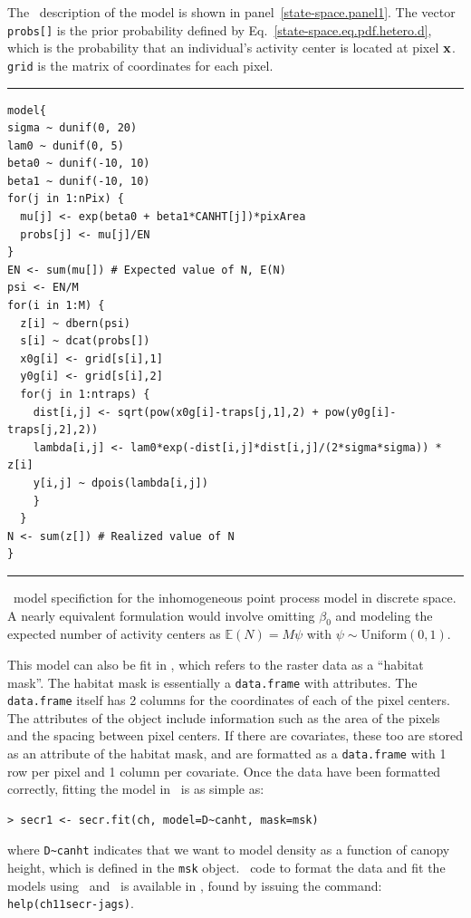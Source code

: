The \bugs~description of the model is shown in
panel~\ref{state-space.panel1}. The vector \verb+probs[]+ is the prior
probability defined by Eq.~\ref{state-space.eq.pdf.hetero.d}, which is
the probability that an individual's activity center is located at
pixel $\bf x$. \verb+grid+ is the matrix of coordinates for each pixel.

\begin{panel}%
\centering
\rule[0.05in]{\textwidth}{.03in}
\begin{small}
\begin{verbatim}
model{
sigma ~ dunif(0, 20)
lam0 ~ dunif(0, 5)
beta0 ~ dunif(-10, 10)
beta1 ~ dunif(-10, 10)
for(j in 1:nPix) {
  mu[j] <- exp(beta0 + beta1*CANHT[j])*pixArea
  probs[j] <- mu[j]/EN
}
EN <- sum(mu[]) # Expected value of N, E(N)
psi <- EN/M
for(i in 1:M) {
  z[i] ~ dbern(psi)
  s[i] ~ dcat(probs[])
  x0g[i] <- grid[s[i],1]
  y0g[i] <- grid[s[i],2]
  for(j in 1:ntraps) {
    dist[i,j] <- sqrt(pow(x0g[i]-traps[j,1],2) + pow(y0g[i]-traps[j,2],2))
    lambda[i,j] <- lam0*exp(-dist[i,j]*dist[i,j]/(2*sigma*sigma)) * z[i]
    y[i,j] ~ dpois(lambda[i,j])
    }
  }
N <- sum(z[]) # Realized value of N
}
\end{verbatim}
\end{small}
\rule[0.15in]{\textwidth}{.03in}
\caption{\bugs~model specifiction for the inhomogeneous point process model in
  discrete space. A nearly equivalent formulation would involve
  omitting $\beta_0$ and modeling the expected number of activity
  centers as $\mathbb{E}(N)=M\psi$ with $\psi \sim \text{Uniform}(0,1)$.}
\label{state-space.panel1}
\end{panel}

This model can also be fit in \secr, which refers
to the raster data as a ``habitat mask''. The habitat mask is
essentially a \verb+data.frame+ with attributes. The \verb+data.frame+
itself has 2 columns for the coordinates of each of the pixel
centers. The attributes of the object include information such as the
area of the pixels and the spacing between pixel centers. If there are
covariates, these too are stored as an attribute of the habitat mask,
and are formatted as a \verb+data.frame+ with 1 row per pixel and 1
column per covariate. Once the data have been formatted
correctly, fitting the model in \secr~is as simple as:
\begin{verbatim}
> secr1 <- secr.fit(ch, model=D~canht, mask=msk)
\end{verbatim}
where \verb+D~canht+ indicates that we want to model density as a
function of canopy height, which is defined in the \verb+msk+ object.
\R~code to format the data and fit the models using \secr~and \jags~is
available in \scrbook, found by issuing the command: \verb#help(ch11secr-jags)#.

